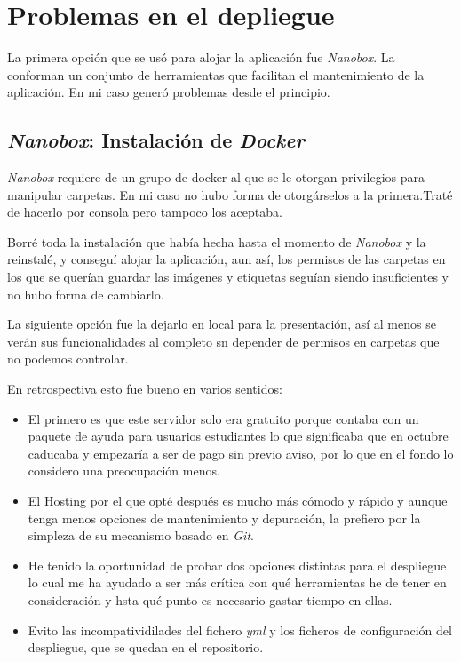 \section{Problemas en el depliegue}

La primera opción que se usó para alojar la aplicación fue  \textit{Nanobox}. La conforman un conjunto de herramientas que facilitan el mantenimiento de la aplicación. En mi caso generó problemas desde el principio.

\subsection{\textit{Nanobox}: Instalación de \textit{Docker}}
\textit{Nanobox} requiere de un grupo de docker al que se le otorgan privilegios para manipular carpetas. En mi caso no hubo forma de otorgárselos a la primera.Traté de hacerlo por consola pero tampoco los aceptaba.

Borré toda la instalación que había hecha hasta el momento de \textit{Nanobox} y la reinstalé, y conseguí alojar la aplicación, aun así, los permisos de las carpetas en los que se querían guardar las imágenes y etiquetas seguían siendo insuficientes y no hubo forma de cambiarlo.

La siguiente opción fue la dejarlo en local para la presentación, así al menos se verán sus funcionalidades al completo sn depender de permisos en carpetas que no podemos controlar.

En retrospectiva esto fue bueno en varios sentidos:

\begin{itemize}
	\item El primero es que este servidor solo era gratuito porque contaba con un paquete de ayuda para usuarios estudiantes lo que significaba que en octubre caducaba y empezaría a ser de pago sin previo aviso, por lo que en el fondo lo considero una preocupación menos.
	
	\item El Hosting por el que opté después es mucho más cómodo y rápido y aunque tenga menos opciones de mantenimiento y depuración, la prefiero por la simpleza de su mecanismo basado en \textit{Git}.
	
	\item He tenido la oportunidad de probar dos opciones distintas para el despliegue lo cual me ha ayudado a ser más crítica con qué herramientas he de tener en consideración y hsta qué punto es necesario gastar tiempo en ellas.
	
	\item Evito las incompatividilades del fichero  \textit{yml} y los ficheros de configuración del despliegue, que se quedan en el repositorio. 
\end{itemize}

